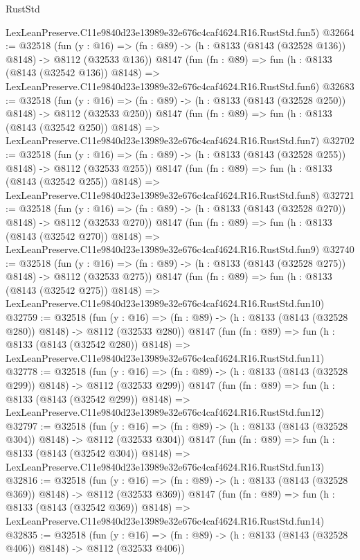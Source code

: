 \begin{lexlean}{RustStd}
\begin{coremodule}
    LexLeanPreserve.C11e9840d23e13989e32e676c4caf4624.R16.RustStd.fun5)
@32664 := @32518
    (fun (y : @16) => (fn : @89) -> (h : @8133 (@8143 (@32528 @136)) @8148) -> @8112 (@32533 @136))
    @8147
    (fun (fn : @89) =>
    fun (h : @8133 (@8143 (@32542 @136)) @8148) =>
    LexLeanPreserve.C11e9840d23e13989e32e676c4caf4624.R16.RustStd.fun6)
@32683 := @32518
    (fun (y : @16) => (fn : @89) -> (h : @8133 (@8143 (@32528 @250)) @8148) -> @8112 (@32533 @250))
    @8147
    (fun (fn : @89) =>
    fun (h : @8133 (@8143 (@32542 @250)) @8148) =>
    LexLeanPreserve.C11e9840d23e13989e32e676c4caf4624.R16.RustStd.fun7)
@32702 := @32518
    (fun (y : @16) => (fn : @89) -> (h : @8133 (@8143 (@32528 @255)) @8148) -> @8112 (@32533 @255))
    @8147
    (fun (fn : @89) =>
    fun (h : @8133 (@8143 (@32542 @255)) @8148) =>
    LexLeanPreserve.C11e9840d23e13989e32e676c4caf4624.R16.RustStd.fun8)
@32721 := @32518
    (fun (y : @16) => (fn : @89) -> (h : @8133 (@8143 (@32528 @270)) @8148) -> @8112 (@32533 @270))
    @8147
    (fun (fn : @89) =>
    fun (h : @8133 (@8143 (@32542 @270)) @8148) =>
    LexLeanPreserve.C11e9840d23e13989e32e676c4caf4624.R16.RustStd.fun9)
@32740 := @32518
    (fun (y : @16) => (fn : @89) -> (h : @8133 (@8143 (@32528 @275)) @8148) -> @8112 (@32533 @275))
    @8147
    (fun (fn : @89) =>
    fun (h : @8133 (@8143 (@32542 @275)) @8148) =>
    LexLeanPreserve.C11e9840d23e13989e32e676c4caf4624.R16.RustStd.fun10)
@32759 := @32518
    (fun (y : @16) => (fn : @89) -> (h : @8133 (@8143 (@32528 @280)) @8148) -> @8112 (@32533 @280))
    @8147
    (fun (fn : @89) =>
    fun (h : @8133 (@8143 (@32542 @280)) @8148) =>
    LexLeanPreserve.C11e9840d23e13989e32e676c4caf4624.R16.RustStd.fun11)
@32778 := @32518
    (fun (y : @16) => (fn : @89) -> (h : @8133 (@8143 (@32528 @299)) @8148) -> @8112 (@32533 @299))
    @8147
    (fun (fn : @89) =>
    fun (h : @8133 (@8143 (@32542 @299)) @8148) =>
    LexLeanPreserve.C11e9840d23e13989e32e676c4caf4624.R16.RustStd.fun12)
@32797 := @32518
    (fun (y : @16) => (fn : @89) -> (h : @8133 (@8143 (@32528 @304)) @8148) -> @8112 (@32533 @304))
    @8147
    (fun (fn : @89) =>
    fun (h : @8133 (@8143 (@32542 @304)) @8148) =>
    LexLeanPreserve.C11e9840d23e13989e32e676c4caf4624.R16.RustStd.fun13)
@32816 := @32518
    (fun (y : @16) => (fn : @89) -> (h : @8133 (@8143 (@32528 @369)) @8148) -> @8112 (@32533 @369))
    @8147
    (fun (fn : @89) =>
    fun (h : @8133 (@8143 (@32542 @369)) @8148) =>
    LexLeanPreserve.C11e9840d23e13989e32e676c4caf4624.R16.RustStd.fun14)
@32835 := @32518
    (fun (y : @16) => (fn : @89) -> (h : @8133 (@8143 (@32528 @406)) @8148) -> @8112 (@32533 @406))

\end{coremodule}
\end{lexlean}
